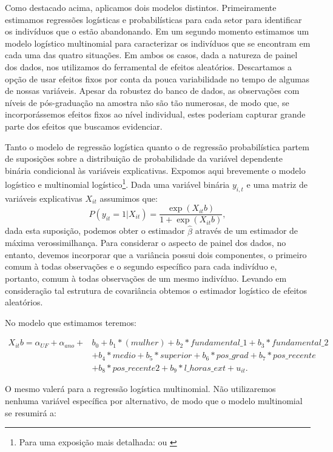 \documentclass[a4paper]{article}
\begin{document}
Como destacado acima, aplicamos dois modelos distintos. Primeiramente estimamos regressões logísticas e probabilísticas para cada setor para identificar os indivíduos que o estão abandonando. Em um segundo momento estimamos um modelo logístico multinomial para caracterizar os indivíduos que se encontram em cada uma das quatro situações. Em ambos os casos, dada a natureza de painel dos dados, nos utilizamos do ferramental de efeitos aleatórios. Descartamos a opção de usar efeitos fixos por conta da pouca variabilidade no tempo de algumas de nossas variáveis. Apesar da robustez do banco de dados, as observações com níveis de pós-graduação na amostra não são tão numerosas, de modo que, se incorporássemos efeitos fixos ao nível individual, estes poderiam capturar grande parte dos efeitos que buscamos evidenciar.

Tanto o modelo de regressão logística quanto o de regressão probabilística partem de suposições sobre a distribuição de probabilidade da variável dependente binária condicional às variáveis explicativas. Expomos aqui brevemente o modelo logístico e multinomial logístico\footnote{Para uma exposição mais detalhada: \citet{wool2010} ou \citet{triv2005} }. Dada uma variável binária $y_{i,t}$ e uma matriz de variáveis explicativas $X_{it}$ assumimos que:
$$ P(y_{it} = 1| X_{it}) = \frac{\exp(X_{it}b)}{1 + \exp(X_{it}b)}, $$
dada esta suposição, podemos obter o estimador $\hat{\beta}$ através de um estimador de máxima verossimilhança. Para considerar o aspecto de painel dos dados, no entanto, devemos incorporar que a variância possui dois componentes, o primeiro comum à todas observações e o segundo específico para cada indivíduo e, portanto, comum à todas observações de um mesmo indivíduo. Levando em consideração tal estrutura de covariância obtemos o estimador logístico de efeitos aleatórios.

No modelo que estimamos teremos:

\begin{align*}
X_{it}b = \alpha_{UF} + \alpha_{ano} + & b_0 + b_1*(mulher) + b_2*fundamental\_1 + b_3*fundamental\_2 \\
& + b_4*medio  + b_5*superior + b_6*pos\_grad + b_7*pos\_recente \\
& + b_8*pos\_recente2 + b_9*l\_horas\_ext + u_{it}.
\end{align*}

O mesmo valerá para a regressão logística multinomial. Não utilizaremos nenhuma variável específica por alternativo, de modo que o modelo multinomial se resumirá a:
\end{document}
